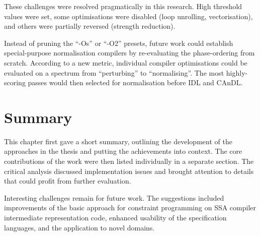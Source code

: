    These challenges were resolved pragmatically in this research.
    High threshold values were set, some optimisations were disabled
    (loop unrolling, vectorisation), and others were partially reversed
    (strength reduction).

    Instead of pruning the ``-Os'' or ``-O2'' presets, future work could
    establish special-purpose normalisation compilers by re-evaluating the
    phase-ordering from scratch.
    According to a new metric, individual compiler optimisations could be
    evaluated on a spectrum from ``perturbing'' to ``normalising''.
    The most highly-scoring passes would then selected for normalisation before
    IDL and CAnDL.
    
\section{Summary}

    This chapter first gave a short summary, outlining the development of the
    approaches in the thesis and putting the achievements into context.
    The core contributions of the work were then listed individually in a
    separate section.
    The critical analysis discussed implementation issues and brought attention
    to details that could profit from further evaluation.

    Interesting challenges remain for future work.
    The suggestions included improvements of the basic approach for constraint
    programming on SSA compiler intermediate representation code, enhanced
    usability of the specification languages, and the application to novel domains.
